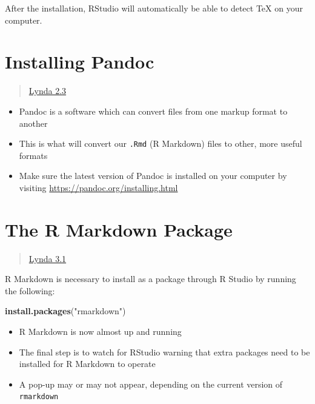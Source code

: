\documentclass[]{article}
\newenvironment{Shaded}{\begin{snugshade}}{\end{snugshade}}
\newcommand{\KeywordTok}[1]{\textcolor[rgb]{0.13,0.29,0.53}{\textbf{#1}}}
\newcommand{\NormalTok}[1]{#1}
\newcommand{\StringTok}[1]{\textcolor[rgb]{0.31,0.60,0.02}{#1}}
\providecommand{\tightlist}{%
  \setlength{\itemsep}{0pt}\setlength{\parskip}{0pt}}
\begin{document}
After the installation, RStudio will automatically be able to detect TeX
on your computer.

\hypertarget{installing-pandoc}{%
\section{Installing Pandoc}\label{installing-pandoc}}

\begin{quote}
\href{https://www.lynda.com/RStudio-tutorials/Installing-Pandoc/699348/2700133-4.html?srchtrk=index\%3a1\%0alinktypeid\%3a2\%0aq\%3ar+markdown\%0apage\%3a1\%0as\%3arelevance\%0asa\%3atrue\%0aproducttypeid\%3a2}{Lynda
2.3}
\end{quote}

\begin{itemize}
\tightlist
\item
  Pandoc is a software which can convert files from one markup format to
  another
\item
  This is what will convert our \texttt{.Rmd} (R Markdown) files to
  other, more useful formats
\item
  Make sure the latest version of Pandoc is installed on your computer
  by visiting \url{https://pandoc.org/installing.html}
\end{itemize}

\hypertarget{the-r-markdown-package}{%
\section{The R Markdown Package}\label{the-r-markdown-package}}

\begin{quote}
\href{https://www.lynda.com/RStudio-tutorials/Installing-R-Markdown/699348/2801129-4.html?srchtrk=index\%3a1\%0alinktypeid\%3a2\%0aq\%3ar+markdown\%0apage\%3a1\%0as\%3arelevance\%0asa\%3atrue\%0aproducttypeid\%3a2}{Lynda
3.1}
\end{quote}

R Markdown is necessary to install as a package through R Studio by
running the following:

\begin{Shaded}
\begin{Highlighting}[]
\KeywordTok{install.packages}\NormalTok{(}\StringTok{"rmarkdown"}\NormalTok{)}
\end{Highlighting}
\end{Shaded}

\begin{itemize}
\tightlist
\item
  R Markdown is now almost up and running
\item
  The final step is to watch for RStudio warning that extra packages
  need to be installed for R Markdown to operate
\item
  A pop-up may or may not appear, depending on the current version of
  \texttt{rmarkdown}
\end{itemize}
\end{document}
